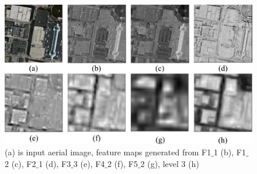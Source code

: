 \documentclass[runningheads]{llncs}
\begin{document}
\begin{figure}
\centering
\includegraphics[width=120mm]{featuremaps}
\caption{(a) is input aerial image, feature maps generated from F1$\_$1 (b), F1$\_$2 (c), F2$\_$1 (d), F3$\_$3 (e), F4$\_$2 (f), F5$\_$2 (g), level 3 (h)}
\label{fig:featuremapsofHF-FCN}
\end{figure}

%   
%   
   
\end{document}
